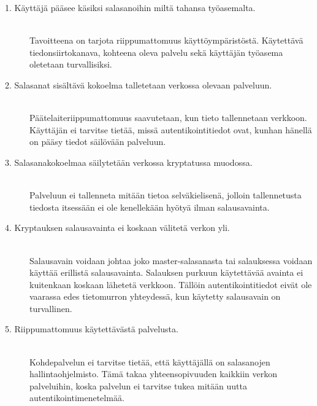 \documentclass{tktltiki}
\begin{document}
\begin{description}

  \item[1. Käyttäjä pääsee käsiksi salasanoihin miltä tahansa työasemalta.] \hfill \\
      Tavoitteena on tarjota riippumattomuus käyttöympäristöstä.
      Käytettävä tiedonsiirtokanava, kohteena oleva palvelu sekä käyttäjän työasema oletetaan turvallisiksi.

  \item[2. Salasanat sisältävä kokoelma talletetaan verkossa olevaan palveluun.] \hfill \\
      Päätelaiteriippumattomuus saavutetaan, kun tieto tallennetaan verkkoon. 
      Käyttäjän ei tarvitse tietää, missä autentikointitiedot ovat, kunhan hänellä on pääsy 
      tiedot säilövään palveluun.
      
  \item[3. Salasanakokoelmaa säilytetään verkossa kryptatussa muodossa.] \hfill \\
      Palveluun ei tallenneta mitään tietoa selväkielisenä, jolloin tallennetusta tiedosta itsessään
      ei ole kenellekään hyötyä ilman salausavainta.

  \item[4. Kryptauksen salausavainta ei koskaan välitetä verkon yli.] \hfill \\
      Salausavain voidaan johtaa joko master-salasanasta tai salauksessa voidaan käyttää erillistä
      salausavainta. Salauksen purkuun käytettävää avainta ei kuitenkaan koskaan lähetetä verkkoon. Tällöin
      autentikointitiedot eivät ole vaarassa edes tietomurron yhteydessä, kun käytetty salausavain on
      turvallinen.

  \item[5. Riippumattomuus käytettävästä palvelusta.] \hfill \\
      Kohdepalvelun ei tarvitse tietää, että käyttäjällä on salasanojen hallintaohjelmisto.
      Tämä takaa yhteensopivuuden kaikkiin verkon palveluihin, koska palvelun ei tarvitse tukea mitään uutta
      autentikointimenetelmää.

\end{description}

 
%   
%   
  
\end{document}
